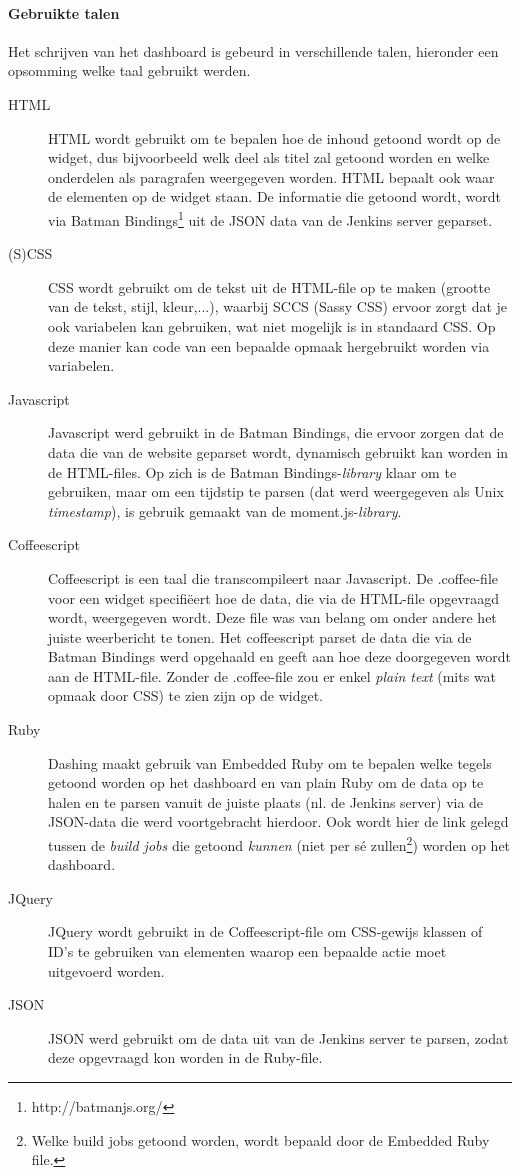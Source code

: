 \documentclass[10pt,a4paper]{article}
\begin{document}
\paragraph{Gebruikte talen}
Het schrijven van het dashboard is gebeurd in verschillende talen, hieronder een opsomming welke taal gebruikt werden.
\begin{description}
\item[HTML] HTML wordt gebruikt om te bepalen hoe de inhoud getoond wordt op de widget, dus bijvoorbeeld welk deel als titel zal getoond worden en welke onderdelen als paragrafen weergegeven worden. HTML bepaalt ook waar de elementen op de widget staan. De informatie die getoond wordt, wordt via Batman Bindings\footnote{http://batmanjs.org/} uit de JSON data van de Jenkins server geparset.
\item[(S)CSS] CSS wordt gebruikt om de tekst uit de HTML-file op te maken (grootte van de tekst, stijl, kleur,...), waarbij SCCS (Sassy CSS) ervoor zorgt dat je ook variabelen kan gebruiken, wat niet mogelijk is in standaard CSS. Op deze manier kan code van een bepaalde opmaak hergebruikt worden via variabelen. 
\item[Javascript] Javascript werd gebruikt in de Batman Bindings, die ervoor zorgen dat de data die van de website geparset wordt, dynamisch gebruikt kan worden in de HTML-files. Op zich is de Batman Bindings-\textit{library} klaar om te gebruiken, maar om een tijdstip te parsen (dat werd weergegeven als Unix \textit{timestamp}), is gebruik gemaakt van de moment.js-\textit{library}.
\item[Coffeescript] Coffeescript is een taal die transcompileert naar Javascript. De .coffee-file voor een widget specifi\"eert hoe de data, die via de HTML-file opgevraagd wordt, weergegeven wordt. Deze file was van belang om onder andere het juiste weerbericht te tonen. Het coffeescript parset de data die via de Batman Bindings werd opgehaald en geeft aan hoe deze doorgegeven wordt aan de HTML-file. Zonder de .coffee-file zou er enkel \textit{plain text} (mits wat opmaak door CSS) te zien zijn op de widget.
\item[Ruby] Dashing maakt gebruik van Embedded Ruby om te bepalen welke tegels getoond worden op het dashboard en van plain Ruby om de data op te halen en te parsen vanuit de juiste plaats (nl. de Jenkins server) via de JSON-data die werd voortgebracht hierdoor. Ook wordt hier de link gelegd tussen de \textit{build jobs} die getoond \emph{kunnen} (niet per s\'e zullen\footnote{Welke build jobs getoond worden, wordt bepaald door de Embedded Ruby file.}) worden op het dashboard.
\item[JQuery] JQuery wordt gebruikt in de Coffeescript-file om CSS-gewijs klassen of ID's te gebruiken van elementen waarop een bepaalde actie moet uitgevoerd worden.
\item[JSON] JSON werd gebruikt om de data uit van de Jenkins server te parsen, zodat deze opgevraagd kon worden in de Ruby-file.
\end{description}
\end{document}
